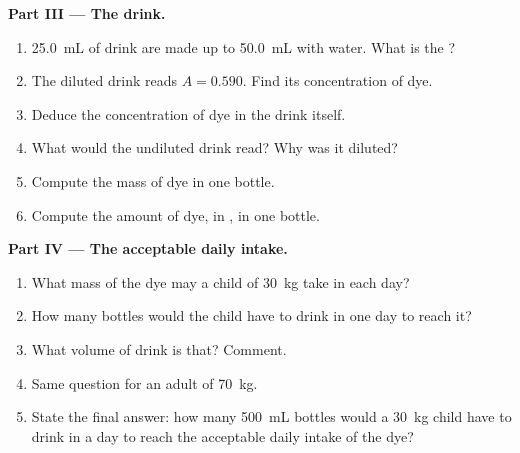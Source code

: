 \begin{problem}
\medskip
\noindent\textbf{Part III --- The drink.}
\begin{enumerate}[resume]
  \item \qty{25.0}{mL} of drink are made up to \qty{50.0}{mL} with water.
        What is the ?
  \item The diluted drink reads $A = 0.590$. Find its concentration of
        dye.
  \item Deduce the concentration of dye in the drink itself.
  \item What would the undiluted drink read? Why was it diluted?
  \item Compute the mass of dye in one bottle.
  \item Compute the amount of dye, in , in one bottle.
\end{enumerate}

\medskip
\noindent\textbf{Part IV --- The acceptable daily intake.}
\begin{enumerate}[resume]
  \item What mass of the dye may a child of \qty{30}{kg} take in each
        day?
  \item How many bottles would the child have to drink in one day to
        reach it?
  \item What volume of drink is that? Comment.
  \item Same question for an adult of \qty{70}{kg}.
  \item State the final answer: how many \qty{500}{mL} bottles would a
        \qty{30}{kg} child have to drink in a day to reach the
        acceptable daily intake of the dye?
\end{enumerate}
\end{problem}
